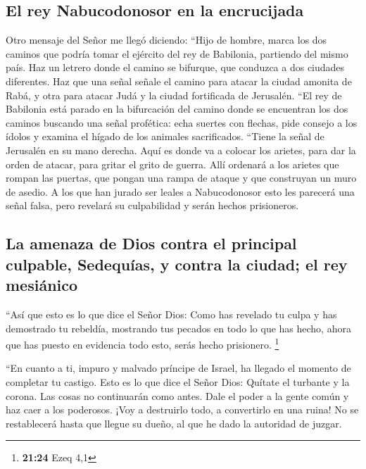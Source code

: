 \hypertarget{el-rey-nabucodonosor-en-la-encrucijada}{%
\subsection{El rey Nabucodonosor en la
encrucijada}\label{el-rey-nabucodonosor-en-la-encrucijada}}

 Otro mensaje del Señor me llegó diciendo:
 ``Hijo de hombre, marca los dos caminos que podría tomar
el ejército del rey de Babilonia, partiendo del mismo país. Haz un
letrero donde el camino se bifurque, que conduzca a dos ciudades
diferentes.  Haz que una señal señale el camino para
atacar la ciudad amonita de Rabá, y otra para atacar Judá y la ciudad
fortificada de Jerusalén.  ``El rey de Babilonia está
parado en la bifurcación del camino donde se encuentran los dos caminos
buscando una señal profética: echa suertes con flechas, pide consejo a
los ídolos y examina el hígado de los animales sacrificados.
 ``Tiene la señal de Jerusalén en su mano derecha. Aquí
es donde va a colocar los arietes, para dar la orden de atacar, para
gritar el grito de guerra. Allí ordenará a los arietes que rompan las
puertas, que pongan una rampa de ataque y que construyan un muro de
asedio.  A los que han jurado ser leales a Nabucodonosor
esto les parecerá una señal falsa, pero revelará su culpabilidad y serán
hechos prisioneros.

\hypertarget{la-amenaza-de-dios-contra-el-principal-culpable-sedequuxedas-y-contra-la-ciudad-el-rey-mesiuxe1nico}{%
\subsection{La amenaza de Dios contra el principal culpable, Sedequías,
y contra la ciudad; el rey
mesiánico}\label{la-amenaza-de-dios-contra-el-principal-culpable-sedequuxedas-y-contra-la-ciudad-el-rey-mesiuxe1nico}}

 ``Así que esto es lo que dice el Señor Dios: Como has
revelado tu culpa y has demostrado tu rebeldía, mostrando tus pecados en
todo lo que has hecho, ahora que has puesto en evidencia todo esto,
serás hecho prisionero. \footnote{\textbf{21:24} Ezeq 4,1}

 ``En cuanto a ti, impuro y malvado príncipe de Israel,
ha llegado el momento de completar tu castigo.  Esto es
lo que dice el Señor Dios: Quítate el turbante y la corona. Las cosas no
continuarán como antes. Dale el poder a la gente común y haz caer a los
poderosos.  ¡Voy a destruirlo todo, a convertirlo en una
ruina! No se restablecerá hasta que llegue su dueño, al que he dado la
autoridad de juzgar.

